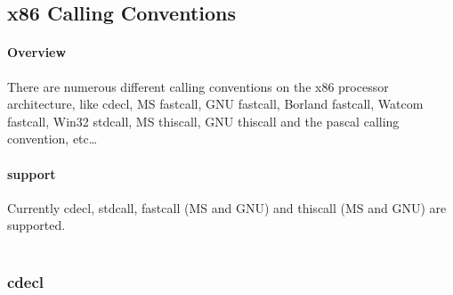 %
%
%
%

\subsection{x86 Calling Conventions}


\paragraph{Overview}

There are numerous different calling conventions on the x86 processor
architecture, like cdecl, MS fastcall, GNU fastcall, Borland fastcall, Watcom
fastcall, Win32 stdcall, MS thiscall, GNU thiscall and the pascal calling
convention, etc\ldots


\paragraph{ support}

Currently cdecl, stdcall, fastcall (MS and GNU) and thiscall (MS and GNU) are
supported.\\
\\


\subsubsection{cdecl}

